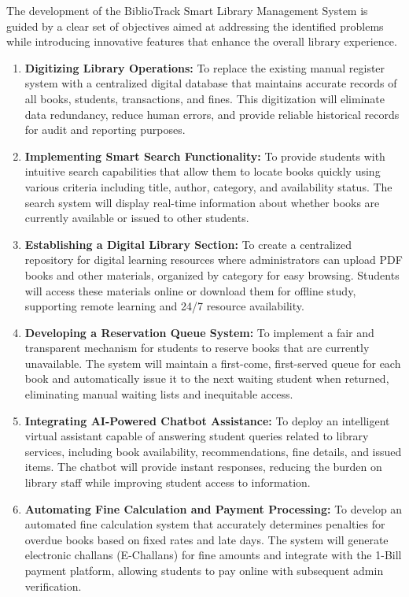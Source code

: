 \documentclass[12pt,a4paper]{report}
\begin{document}
The development of the BiblioTrack Smart Library Management System is guided by a clear set of objectives aimed at addressing the identified problems while introducing innovative features that enhance the overall library experience.

\begin{enumerate}
    \item \textbf{Digitizing Library Operations:} To replace the existing manual register system with a centralized digital database that maintains accurate records of all books, students, transactions, and fines. This digitization will eliminate data redundancy, reduce human errors, and provide reliable historical records for audit and reporting purposes.

    
    \item \textbf{Implementing Smart Search Functionality:} To provide students with intuitive search capabilities that allow them to locate books quickly using various criteria including title, author, category, and availability status. The search system will display real-time information about whether books are currently available or issued to other students.  
    
    \item \textbf{Establishing a Digital Library Section:} To create a centralized repository for digital learning resources where administrators can upload PDF books and other materials, organized by category for easy browsing. Students will access these materials online or download them for offline study, supporting remote learning and 24/7 resource availability.
    
    \item \textbf{Developing a Reservation Queue System:} To implement a fair and transparent mechanism for students to reserve books that are currently unavailable. The system will maintain a first-come, first-served queue for each book and automatically issue it to the next waiting student when returned, eliminating manual waiting lists and inequitable access. 
    \item \textbf{Integrating AI-Powered Chatbot Assistance:} To deploy an intelligent virtual assistant capable of answering student queries related to library services, including book availability, recommendations, fine details, and issued items. The chatbot will provide instant responses, reducing the burden on library staff while improving student access to information.
    
    \item \textbf{Automating Fine Calculation and Payment Processing:} To develop an automated fine calculation system that accurately determines penalties for overdue books based on fixed rates and late days. The system will generate electronic challans (E-Challans) for fine amounts and integrate with the 1-Bill payment platform, allowing students to pay online with subsequent admin verification.
  

\end{enumerate}
\end{document}
